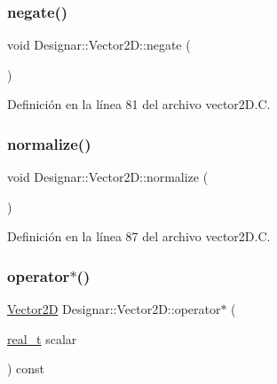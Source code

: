 \subsubsection{\texorpdfstring{negate()}{negate()}}
{\footnotesize\ttfamily void Designar\+::\+Vector2\+D\+::negate (\begin{DoxyParamCaption}{ }\end{DoxyParamCaption})}



Definición en la línea 81 del archivo vector2\+D.\+C.

\mbox{\label{class_designar_1_1_vector2_d_ac504a8cec82e7183bd0105e83942fd67}} 
\subsubsection{\texorpdfstring{normalize()}{normalize()}}
{\footnotesize\ttfamily void Designar\+::\+Vector2\+D\+::normalize (\begin{DoxyParamCaption}{ }\end{DoxyParamCaption})}



Definición en la línea 87 del archivo vector2\+D.\+C.

\mbox{\label{class_designar_1_1_vector2_d_ad0e749363b81d3ec6eb87d7e7d378f63}} 
\subsubsection{\texorpdfstring{operator$\ast$()}{operator*()}\hspace{0.1cm}{\footnotesize\ttfamily [1/2]}}
{\footnotesize\ttfamily \hyperlink{class_designar_1_1_vector2_d}{Vector2D} Designar\+::\+Vector2\+D\+::operator$\ast$ (\begin{DoxyParamCaption}\item[{\hyperlink{namespace_designar_aca2c32af26808dbec1f3a3071fad25ce}{real\+\_\+t}}]{scalar }\end{DoxyParamCaption}) const}



